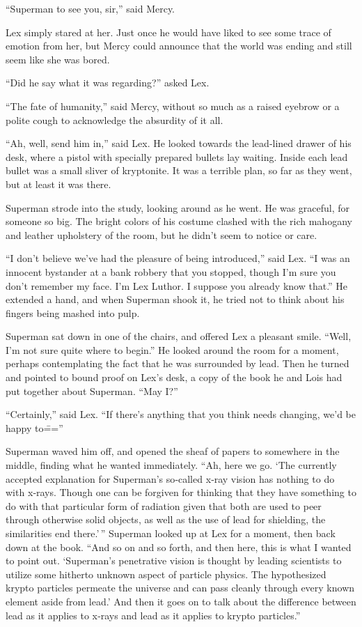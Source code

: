 \documentclass[ebook,12pt]{memoir}
\begin{document}
``Superman to see you, sir,'' said Mercy.

Lex simply stared at her. Just once he would have liked to see some
trace of emotion from her, but Mercy could announce that the world was
ending and still seem like she was bored.

``Did he say what it was regarding?'' asked Lex.

``The fate of humanity,'' said Mercy, without so much as a raised
eyebrow or a polite cough to acknowledge the absurdity of it all.

``Ah, well, send him in,'' said Lex. He looked towards the lead‐lined
drawer of his desk, where a pistol with specially prepared bullets lay
waiting. Inside each lead bullet was a small sliver of kryptonite. It
was a terrible plan, so far as they went, but at least it was there.

Superman strode into the study, looking around as he went. He was
graceful, for someone so big. The bright colors of his costume clashed
with the rich mahogany and leather upholstery of the room, but he didn't
seem to notice or care.

``I don't believe we've had the pleasure of being introduced,'' said
Lex. ``I was an innocent bystander at a bank robbery that you stopped,
though I'm sure you don't remember my face. I'm Lex Luthor. I suppose
you already know that.'' He extended a hand, and when Superman shook it,
he tried not to think about his fingers being mashed into pulp.

Superman sat down in one of the chairs, and offered Lex a pleasant
smile. ``Well, I'm not sure quite where to begin.'' He looked around the
room for a moment, perhaps contemplating the fact that he was surrounded
by lead. Then he turned and pointed to bound proof on Lex's desk, a copy
of the book he and Lois had put together about Superman. ``May I?''

``Certainly,'' said Lex. ``If there's anything that you think needs
changing, we'd be happy to\===''

Superman waved him off, and opened the sheaf of papers to somewhere in
the middle, finding what he wanted immediately. ``Ah, here we go. `The
currently accepted explanation for Superman's so‐called x‐ray vision has
nothing to do with x‐rays. Though one can be forgiven for thinking that
they have something to do with that particular form of radiation given
that both are used to peer through otherwise solid objects, as well as
the use of lead for shielding, the similarities end there.'\,'' Superman
looked up at Lex for a moment, then back down at the book. ``And so on
and so forth, and then here, this is what I wanted to point out.
`Superman's penetrative vision is thought by leading scientists to
utilize some hitherto unknown aspect of particle physics. The
hypothesized krypto particles permeate the universe and can pass cleanly
through every known element aside from lead.' And then it goes on to
talk about the difference between lead as it applies to x‐rays and lead
as it applies to krypto particles.''
\end{document}
